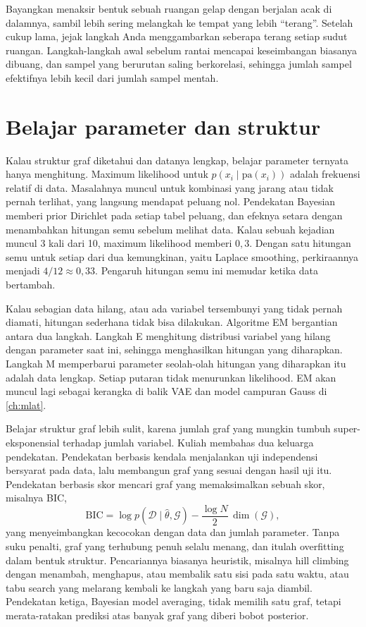 Bayangkan menaksir bentuk sebuah ruangan gelap dengan berjalan acak di dalamnya, sambil lebih sering
melangkah ke tempat yang lebih ``terang''. Setelah cukup lama, jejak langkah Anda menggambarkan
seberapa terang setiap sudut ruangan. Langkah-langkah awal sebelum rantai mencapai keseimbangan
biasanya dibuang, dan sampel yang berurutan saling berkorelasi, sehingga jumlah sampel efektifnya
lebih kecil dari jumlah sampel mentah.

\section{Belajar parameter dan struktur}

Kalau struktur graf diketahui dan datanya lengkap, belajar parameter ternyata hanya menghitung.
Maximum likelihood untuk $p(x_i\mid\mathrm{pa}(x_i))$ adalah frekuensi relatif di data. Masalahnya
muncul untuk kombinasi yang jarang atau tidak pernah terlihat, yang langsung mendapat peluang nol.
Pendekatan Bayesian memberi prior Dirichlet pada setiap tabel peluang, dan efeknya setara dengan
menambahkan hitungan semu sebelum melihat data. Kalau sebuah kejadian muncul 3 kali dari 10, maximum
likelihood memberi $0{,}3$. Dengan satu hitungan semu untuk setiap dari dua kemungkinan, yaitu
Laplace smoothing, perkiraannya menjadi $4/12\approx0{,}33$. Pengaruh hitungan semu ini memudar ketika
data bertambah.

Kalau sebagian data hilang, atau ada variabel tersembunyi yang tidak pernah diamati, hitungan
sederhana tidak bisa dilakukan. Algoritme EM \citep{dempster1977} bergantian antara dua langkah. Langkah
E menghitung distribusi variabel yang hilang dengan parameter saat ini, sehingga menghasilkan hitungan
yang diharapkan. Langkah M memperbarui parameter seolah-olah hitungan yang diharapkan itu adalah
data lengkap. Setiap putaran tidak menurunkan likelihood. EM akan muncul lagi sebagai kerangka di
balik VAE dan model campuran Gauss di \cref{ch:mlat}.

Belajar struktur graf lebih sulit, karena jumlah graf yang mungkin tumbuh super-eksponensial
terhadap jumlah variabel. Kuliah membahas dua keluarga pendekatan. Pendekatan berbasis kendala
menjalankan uji independensi bersyarat pada data, lalu membangun graf yang sesuai dengan hasil uji
itu. Pendekatan berbasis skor mencari graf yang memaksimalkan sebuah skor, misalnya BIC,
\begin{equation}
\mathrm{BIC}=\log p(\mathcal D\mid\hat\theta,\mathcal G)-\frac{\log N}{2}\,\dim(\mathcal G),
\end{equation}
yang menyeimbangkan kecocokan dengan data dan jumlah parameter. Tanpa suku penalti, graf yang
terhubung penuh selalu menang, dan itulah overfitting dalam bentuk struktur. Pencariannya biasanya
heuristik, misalnya hill climbing dengan menambah, menghapus, atau membalik satu sisi pada satu waktu,
atau tabu search yang melarang kembali ke langkah yang baru saja diambil. Pendekatan ketiga, Bayesian
model averaging, tidak memilih satu graf, tetapi merata-ratakan prediksi atas banyak graf yang
diberi bobot posterior.

